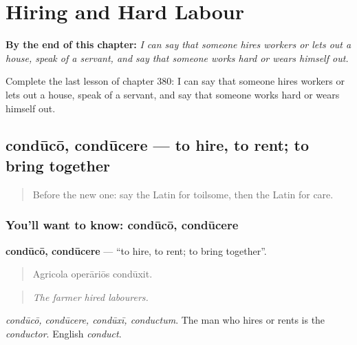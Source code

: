 
\chapter{Hiring and Hard Labour}
\label{ch:la-hiring-and-hard-labour}

\begin{chapteropening}
\textbf{By the end of this chapter:} \emph{I can say that someone hires workers or lets out a house, speak of a servant, and say that someone works hard or wears himself out.}

Complete the last lesson of chapter 380: I can say that someone hires workers or lets out a house, speak of a servant, and say that someone works hard or wears himself out.
\end{chapteropening}

\section[condūcō, condūcere]{condūcō, condūcere — to hire, to rent; to bring together}

\label{lesson:LA-C380-conduco}



\begin{quote}
Before the new one: say the Latin for toilsome, then the Latin for care.
\end{quote}

\subsection*{You'll want to know: condūcō, condūcere}
\textbf{condūcō, condūcere} — \textquotedblleft{}to hire, to rent; to bring together\textquotedblright{}.

\begin{quote}
Agricola operāriōs condūxit.
\end{quote}

\begin{quote}
\emph{The farmer hired labourers.}
\end{quote}

\emph{condūcō, condūcere, condūxī, conductum}. The man who hires or rents is the \emph{conductor}. English \emph{conduct}.

